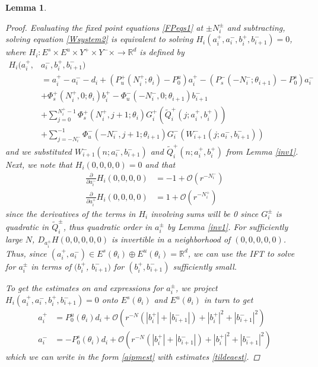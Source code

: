 \documentclass[12pt]{article}
\def\R{{\mathbb R}}
\newtheorem{lemma}{Lemma}
\begin{document}
\begin{lemma}
\begin{proof}
Evaluating the fixed point equations \eqref{FPeqs1} at $\pm N_i^\pm$ and subtracting, solving equation \eqref{Wsystem2} is equivalent to solving $H_i(a_i^+, a_i^-, b_i^+, b_{i+1}^-) = 0$, where $H_i: E^s \times E^u \times Y^+ \times Y^- \times \rightarrow \R^d$ is defined by
\begin{align*}
H_i(a_i^+, &a_i^-, b_i^+, b_{i+1}^-) \\
&= a_i^+ - a_i^- - d_i + (P_u^+(N_i^+; \theta_i) - P_0^u) a_i^+ - (P_s^-(-N_i^-; \theta_{i+1}) - P_0^s) a_i^- \\
&+ \Phi_s^+(N_i^+, 0; \theta_i) b_i^+ - \Phi_u^-(-N_i^-, 0; \theta_{i+1}) b_{i+1}^- \\
&+ \sum_{j = 0}^{N_i^+-1} \Phi_s^+(N_i^+, j+1; \theta_i) G_i^+(\tilde{Q}_i^+(j; a_i^+, b_i^+)) \\
&+ \sum_{j = -N_i^-}^{-1} \Phi_u^-(-N_i^-, j+1; \theta_{i+1}) G_i^-(W_{i+1}^-(j; a_i^-, b_{i+1}^-))
\end{align*}
and we substituted $W_{i+1}^-(n; a_i^-, b_{i+1}^-)$ and $\tilde{Q}_i^+(n; a_i^+, b_i^+)$ from Lemma \ref{inv1}. Next, we note that $H_i(0,0,0,0) = 0$ and that 
\begin{align*}
\frac{\partial}{\partial a_i^-} H_i(0, 0, 0, 0) &= -1 + \mathcal{O}(r^{-N_i^-}) \\
\frac{\partial}{\partial a_i^+} H_i(0, 0, 0, 0) &= 1 + \mathcal{O}(r^{-N_i^+})
\end{align*}
since the derivatives of the terms in $H_i$ involving sums will be 0 since $G_i^\pm$ is quadratic in $\tilde{Q}_i^\pm$, thus quadratic order in $a_i^\pm$ by Lemma \ref{inv1}. For sufficiently large $N$, $D_{a_i^\pm} H(0, 0, 0, 0, 0)$ is invertible in a neighborhood of $(0, 0, 0, 0, 0)$. Thus, since $(a_i^+, a_i^-) \in E^s(\theta_i) \oplus E^u(\theta_i) = \R^d$, we can use the IFT to solve for $a_i^\pm$ in terms of $(b_i^+$, $b_{i+1}^-)$ for $(b_i^+, b_{i+1}^-)$ sufficiently small.

To get the estimates on and expressions for $a_i^\pm$, we project $H_i(a_i^+, a_i^-, b_i^+, b_{i+1}^-) = 0$ onto $E^s(\theta_i)$ and $E^u(\theta_i)$ in turn to get 
\begin{align*}
a_i^+ &= P_0^u(\theta_i) d_i + \mathcal{O}(r^{-N}(|b_i^+|+|b_{i+1}^-|) + |b_i^+|^2+|b_{i+1}^-|^2) \\
a_i^- &= -P_0^s(\theta_i) d_i + \mathcal{O}(r^{-N}(|b_i^+|+|b_{i+1}^-|) + |b_i^+|^2+|b_{i+1}^-|^2)
\end{align*}
which we can write in the form \eqref{aipmest} with estimates \eqref{tildeaest}. 


\end{proof}
\end{lemma}
\end{document}
